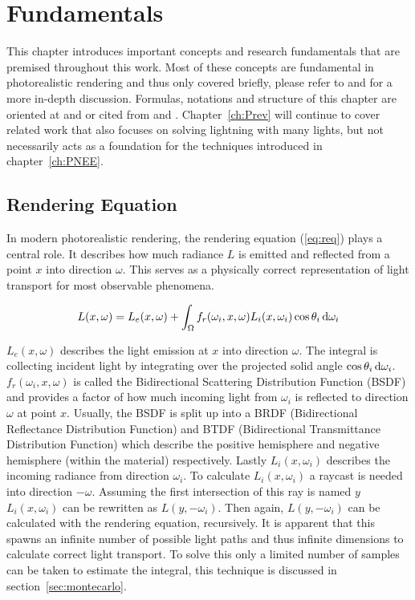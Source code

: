 \chapter{Fundamentals}
\label{ch:Fundamentals}
This chapter introduces important concepts and research fundamentals that are premised throughout this work. Most of these concepts are fundamental in photorealistic rendering and thus only covered briefly, please refer to \textcite{veach1997robust} and \textcite{DBLP:conf/siggraph/Kajiya86} for a more in-depth discussion. Formulas, notations and structure of this chapter are oriented at and or cited from \textcite{lecture} and \textcite{pbrt}. Chapter~\ref{ch:Prev} will continue to cover related work that also focuses on solving lightning with many lights, but not necessarily acts as a foundation for the techniques introduced in chapter~\ref{ch:PNEE}.


\section{Rendering Equation}

In modern photorealistic rendering, the rendering equation (\ref{eq:req}) plays a central role. It describes how much radiance $L$ is emitted and reflected from a point $x$ into direction $\omega$. This serves as a physically correct representation of light transport for most observable phenomena.

\begin{align}
\label{eq:req}
L(x, \omega) =  L_e(x, \omega) + \int_{\Omega}f_r(\omega_i, x, \omega) L_i(x, \omega_i)\cos\theta_i \mathop{}\!\mathrm{d}\omega_i 
\end{align}

$L_e(x, \omega)$ describes the light emission at $x$ into direction $\omega$. The integral is collecting incident light by integrating over the projected solid angle $\cos\theta_i\mathop{}\!\mathrm{d}\omega_i$. $f_r(\omega_i, x, \omega)$ is called the Bidirectional Scattering Distribution Function (BSDF) and provides a factor of how much incoming light from $\omega_i$ is reflected to direction $\omega$ at point $x$. Usually, the BSDF is split up into a BRDF (Bidirectional Reflectance Distribution Function) and BTDF (Bidirectional Transmittance Distribution Function) which describe the positive hemisphere and negative hemisphere (within the material) respectively. Lastly $L_i(x, \omega_i)$ describes the incoming radiance from direction $\omega_i$. To calculate $L_i(x, \omega_i)$ a raycast is needed into direction $-\omega$. Assuming the first intersection of this ray is named $y$ $L_i(x, \omega_i)$ can be rewritten as $L(y, -\omega_i)$. Then again, $L(y, -\omega_i)$ can be calculated with the rendering equation, recursively. It is apparent that this spawns an infinite number of possible light paths and thus infinite dimensions to calculate correct light transport. To solve this only a limited number of samples can be taken to estimate the integral, this technique is discussed in section~\ref{sec:montecarlo}.

